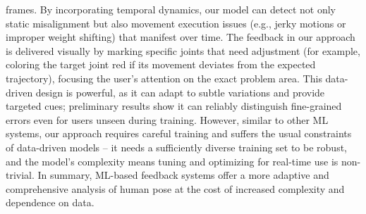 \documentclass{article}
\begin{document}
frames. By incorporating temporal dynamics, our model can detect not only static misalignment but also movement execution issues (e.g., jerky motions or improper weight shifting) that manifest over time. The feedback in our approach is delivered visually by marking specific joints that need adjustment (for example, coloring the target joint red if its movement deviates from the expected trajectory), focusing the user’s attention on the exact problem area. This data-driven design is powerful, as it can adapt to subtle variations and provide targeted cues; preliminary results show it can reliably distinguish fine-grained errors even for users unseen during training. However, similar to other ML systems, our approach requires careful training and suffers the usual constraints of data-driven models – it needs a sufficiently diverse training set to be robust, and the model’s complexity means tuning and optimizing for real-time use is non-trivial. In summary, ML-based feedback systems offer a more adaptive and comprehensive analysis of human pose at the cost of increased complexity and dependence on data.
\end{document}
